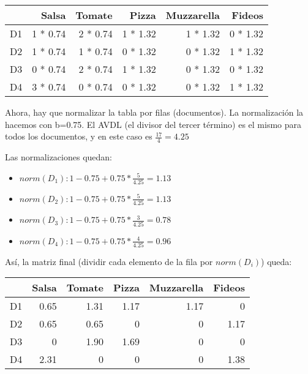 \documentclass[a4paper]{article}
\begin{document}
    \begin{table}[H]
        \begin{tabular}{|l|r|r|r|r|r|}
        \hline
         & Salsa & Tomate & Pizza & Muzzarella & Fideos \\
        \hline
        D1 & {\color{green}1} * {\color{red}0.74}  & {\color{green}2} * {\color{red}0.74} & {\color{green}1} * {\color{red}1.32} & {\color{green}1} * {\color{red}1.32} & {\color{green}0} * {\color{red}1.32}  \\
        D2 & {\color{green}1} * {\color{red}0.74}  & {\color{green}1} * {\color{red}0.74} & {\color{green}0} * {\color{red}1.32} & {\color{green}0} * {\color{red}1.32} & {\color{green}1} * {\color{red}1.32}  \\
        D3 & {\color{green}0} * {\color{red}0.74}  & {\color{green}2} * {\color{red}0.74} & {\color{green}1} * {\color{red}1.32} & {\color{green}0} * {\color{red}1.32} & {\color{green}0} * {\color{red}1.32}  \\
        D4 & {\color{green}3} * {\color{red}0.74}  & {\color{green}0} * {\color{red}0.74} & {\color{green}0} * {\color{red}1.32} & {\color{green}0} * {\color{red}1.32} & {\color{green}1} * {\color{red}1.32}  \\
        \hline
        \end{tabular}
    \end{table}

    Ahora, hay que normalizar la tabla por filas (documentos). La normalización la hacemos con b=0.75. El AVDL (el divisor del tercer término) es el mismo para todos los documentos, y en este caso es $\frac{17}{4}=4.25$
    
    Las normalizaciones quedan:

    \begin{itemize}
        \item $norm(D_1): 1-0.75+0.75*\frac{5}{4.25} = 1.13$
        \item $norm(D_2): 1-0.75+0.75*\frac{5}{4.25} = 1.13$
        \item $norm(D_3): 1-0.75+0.75*\frac{3}{4.25} = 0.78$
        \item $norm(D_4): 1-0.75+0.75*\frac{4}{4.25} = 0.96$
    \end{itemize}
    
    Así, la matriz final (dividir cada elemento de la fila por $norm(D_i)$) queda:
    
    \begin{table}[H]
        \begin{tabular}{|l|r|r|r|r|r|}
        \hline
         & Salsa & Tomate & Pizza & Muzzarella & Fideos \\
        \hline
        D1 & 0.65 & 1.31 & 1.17 & 1.17 & 0 \\
        D2 & 0.65 & 0.65 & 0 & 0 & 1.17 \\
        D3 & 0  & 1.90 & 1.69 & 0 & 0  \\
        D4 & 2.31  & 0 & 0 & 0 & 1.38  \\
        \hline
        \end{tabular}
    \end{table}
\end{document}
